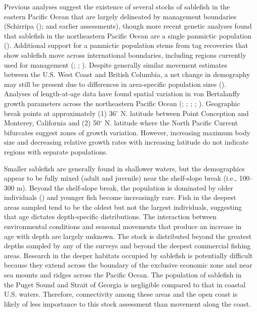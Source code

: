 \documentclass[
  english,
]{article}
\begin{document}
Previous analyses suggest the existence of several stocks of sablefish
in the eastern Pacific Ocean that are largely delineated by management
boundaries (Schirripa ();
and earlier assessments), though more recent genetic analyses found that
sablefish in the northeastern Pacific Ocean are a single panmictic
population (). Additional support for a panmictic population stems from tag
recoveries that show sablefish move across international boundaries,
including regions currently used for management
(;
;
). Despite
generally similar movement estimates between the U.S. West Coast and
British Columbia, a net change in demography may still be present due to
differences in area-specific population sizes
(). Analyses of
length-at-age data have found spatial variation in von Bertalanffy
growth parameters across the northeastern Pacific Ocean
(;
;
;
;
). Geographic
break points at approximately (1) 36\(^\circ\) N. latitude between Point
Conception and Monterey, California and (2) 50\(^\circ\) N. latitude
where the North Pacific Current bifurcates suggest zones of growth
variation. However, increasing maximum body size and decreasing relative
growth rates with increasing latitude do not indicate regions with
separate populations.

Smaller sablefish are generally found in shallower waters, but the
demographics appear to be fully mixed (adult and juvenile) near the
shelf-slope break (i.e., 100--300 m). Beyond the shelf-slope break, the
population is dominated by older individuals
() and younger fish
become increasingly rare. Fish in the deepest areas sampled tend to be
the oldest but not the largest individuals, suggesting that age dictates
depth-specific distributions. The interaction between environmental
conditions and seasonal movements that produce an increase in age with
depth are largely unknown. The stock is distributed beyond the greatest
depths sampled by any of the surveys and beyond the deepest commercial
fishing areas. Research in the deeper habitats occupied by sablefish is
potentially difficult because they extend across the boundary of the
exclusive economic zone and near sea mounts and ridges across the
Pacific Ocean. The population of sablefish in the Puget Sound and Strait
of Georgia is negligible compared to that in coastal U.S. waters.
Therefore, connectivity among these areas and the open coast is likely
of less importance to this stock assessment than movement along the
coast.
\end{document}
